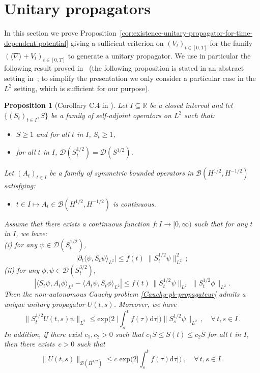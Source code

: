 \documentclass[12pt]{article}
\newcommand{\jnabla}{{\langle\nabla\rangle}}
\theoremstyle{plain}
\newtheorem{prop}[theo]{Proposition}
\begin{document}
\section{Unitary propagators}\label{sec:Unitary}

In this section we prove Proposition~\ref{cor:existence-unitary-propagator-for-time-dependent-potential} giving a  sufficient criterion on $(V_t)_{t\in[0,T]}$ for the family $(\jnabla + V_t)_{t\in[0,T]}$ to generate a unitary propagator. We use in particular the following result proved in~\cite[Appendix C]{AmmariBreteaux} (the following proposition is stated in an abstract setting in~\cite{AmmariBreteaux}; to simplify the presentation we only consider a particular  case in the $L^2$ setting, which is sufficient for our purpose).




\begin{prop}[Corollary C.4 in \cite{AmmariBreteaux}]
\label{cor:Am-Bre}
Let $I\subseteq \mathbb{R}$ be a closed interval and let $\{(S_t)_{t\in I},S\}$  be a family of self-adjoint operators on $L^2$ such that:
\begin{itemize}
 \item $S\ge 1$ and for all $t$ in $I$, $S_t\geq 1$,
 \item for all $t$ in $I$, $\mathcal{D}(S_t^{1/2})=\mathcal{D}(S^{1/2})$.
\end{itemize}
Let $(A_t)_{t\in I}$ be a family of symmetric bounded operators in $\mathcal{B}(H^{1/2},H^{-1/2})$  satisfying:
\begin{itemize}
 \item $t\in I\mapsto A_t\in \mathcal{B}(H^{1/2},H^{-1/2})$ is continuous.
\end{itemize}
Assume that there exists a continuous function $f:I\to[0,\infty)$ such that for any $t$ in $I$, we have:\\
(i) for any $\psi\in \mathcal{D}(S_t^{1/2})$,
\begin{equation*}
\big|\partial_t\langle \psi,  S_t \psi\rangle_{L^2}\big|\le f(t) \;\|S_t^{1/2}\psi\|_{L^2}^2\,;
\end{equation*}
(ii) for any $\phi,\psi\in\mathcal{D}(S_t^{3/2})$,
\begin{equation*}
\left|\langle S_t\psi, A_t\phi\rangle_{L^2}-\langle A_t\psi,S_t\phi\rangle_{L^2} \right|\le f(t) \,\|S_t^{1/2}\psi\|_{L^2}\;\|S_t^{1/2}\phi\|_{L^2}.
\end{equation*}
Then the non-autonomous Cauchy problem \eqref{Cauchy-pb-propagateur} admits a unique unitary propagator $U(t,s)$.
Moreover, we have
\begin{equation*}
\|S_t^{1/2}U(t,s)\psi\|_{L^2}\le \mathrm{exp}\Big(2 \;\big|\int_s^t f(\tau) \mathrm{d}\tau\big|\Big) \|S_s^{1/2}\psi\|_{L^2}\,, \quad \forall \, t,s\in I\,.
\end{equation*}
In addition, if there exist $c_1,c_2>0$ such that $c_1 S\leq S(t)\leq c_2 S$ for all $t$ in $I$, then there exists~$c>0$
such that
\begin{equation*}
\|U(t,s)\|_{\mathcal{B}(H^{1/2})}\le c\;\mathrm{exp}\Big(2\big|\int_s^t f(\tau)\mathrm{d}\tau\big|\Big) \;, \quad \forall \,  t,s\in I\,.
\end{equation*}
\end{prop}
\end{document}
